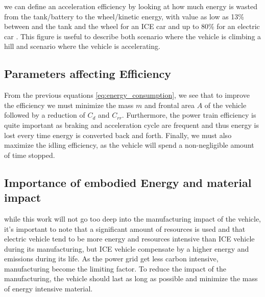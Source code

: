 we can define an acceleration efficiency by looking at how much energy is wasted from the tank/battery to the wheel/kinetic energy, with value as low as 13\% between and the tank and the wheel for an ICE car and up to 80\% for an electric car \cite{lohse-busch_ambient_2013}. This figure is useful to describe both scenario where the vehicle is climbing a hill and scenario where the vehicle is accelerating.

\subsection{Parameters affecting Efficiency}

From the previous equations \eqref{eq:energy_consumption}, we see that to improve the efficiency we must minimize the mass $m$ and frontal area $A$ of the vehicle followed by a reduction of $C_d$ and $C_{rr}$. Furthermore, the power train efficiency is quite important as braking and acceleration cycle are frequent and thus energy is lost every time energy is converted back and forth. Finally, we must also maximize the idling efficiency, as the vehicle will spend a non-negligible amount of time stopped.

\subsection{Importance of embodied Energy and material impact}

while this work will not go too deep into the manufacturing impact of the vehicle, it's important to note that a significant amount of resources is used and that electric vehicle tend to be more energy and resources intensive than ICE vehicle during its manufacturing, but ICE vehicle compensate by a higher energy and emissions during its life. As the power grid get less carbon intensive, manufacturing become the limiting factor. To reduce the impact of the manufacturing, the vehicle should last as long as possible and minimize the mass of energy intensive material.

